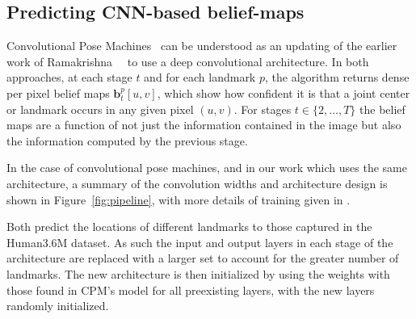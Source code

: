 \documentclass[10pt,twocolumn,letterpaper]{article}
\begin{document}
\subsection{Predicting CNN-based belief-maps}
\label{sec:CNN-belief-maps}
Convolutional Pose Machines~\cite{wei2016convolutional} can be
understood as an updating of the earlier work of
Ramakrishna~\etal~\cite{ramakrishna2014pose} to use a deep
convolutional architecture. In both approaches, at each stage $t$ and
for each landmark $p$, the algorithm returns dense per pixel belief
maps $\mathbf{b}_{t}^{p}[u,v]$, which show how confident it is that a
joint center or landmark occurs in any given pixel $(u,v)$.
For stages $t\in\{2,\ldots,T\}$ the belief maps are a function of
not just the information contained in the image but also the
information computed by the previous stage.%

In the case of convolutional pose machines, and in our work which uses
the same architecture, a summary of the convolution widths and
architecture design is shown in Figure~\ref{fig:pipeline}, with
more details of training given in %
\cite{wei2016convolutional}.

Both \cite{ramakrishna2014pose,wei2016convolutional} predict the locations of
different landmarks to those captured in the Human3.6M dataset. As such the
input and output layers in each stage of the architecture are replaced with a
larger set to account for the greater number of landmarks. The new architecture
is then initialized by using the weights with those found in CPM's model for all
preexisting layers, with the new layers randomly initialized.
\end{document}
